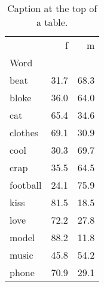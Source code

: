 \begin{table}
\centering
\caption{Caption at the top of a table.}
\label{tab:pct}
\begin{tabular}{lrr}
\toprule
{} &     f &     m \\
Word     &       &       \\
\midrule
beat     &  31.7 &  68.3 \\
bloke    &  36.0 &  64.0 \\
cat      &  65.4 &  34.6 \\
clothes  &  69.1 &  30.9 \\
cool     &  30.3 &  69.7 \\
crap     &  35.5 &  64.5 \\
football &  24.1 &  75.9 \\
kiss     &  81.5 &  18.5 \\
love     &  72.2 &  27.8 \\
model    &  88.2 &  11.8 \\
music    &  45.8 &  54.2 \\
phone    &  70.9 &  29.1 \\
\bottomrule
\end{tabular}
\end{table}